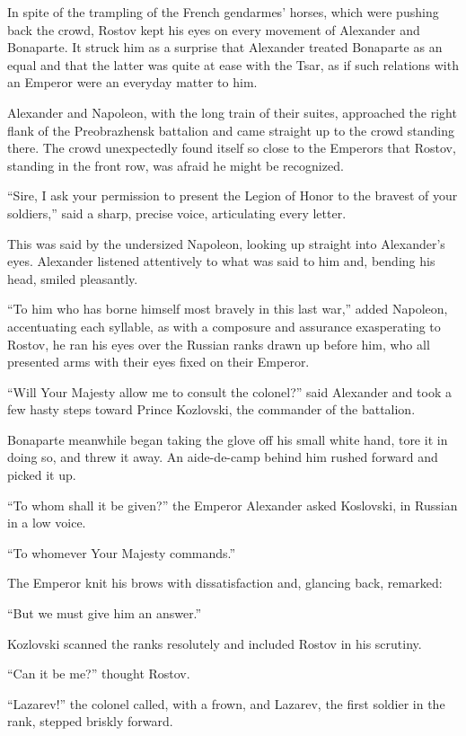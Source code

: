 In spite of the trampling of the French gendarmes' horses, which
were pushing back the crowd, Rostov kept his eyes on every
movement of Alexander and Bonaparte. It struck him as a surprise
that Alexander treated Bonaparte as an equal and that the latter
was quite at ease with the Tsar, as if such relations with an
Emperor were an everyday matter to him.

Alexander and Napoleon, with the long train of their suites,
approached the right flank of the Preobrazhensk battalion and
came straight up to the crowd standing there. The crowd
unexpectedly found itself so close to the Emperors that Rostov,
standing in the front row, was afraid he might be recognized.

``Sire, I ask your permission to present the Legion of Honor to
the bravest of your soldiers,'' said a sharp, precise voice,
articulating every letter.

This was said by the undersized Napoleon, looking up straight
into Alexander's eyes. Alexander listened attentively to what was
said to him and, bending his head, smiled pleasantly.

``To him who has borne himself most bravely in this last war,''
added Napoleon, accentuating each syllable, as with a composure
and assurance exasperating to Rostov, he ran his eyes over the
Russian ranks drawn up before him, who all presented arms with
their eyes fixed on their Emperor.

``Will Your Majesty allow me to consult the colonel?'' said
Alexander and took a few hasty steps toward Prince Kozlovski, the
commander of the battalion.

Bonaparte meanwhile began taking the glove off his small white
hand, tore it in doing so, and threw it away. An aide-de-camp
behind him rushed forward and picked it up.

``To whom shall it be given?'' the Emperor Alexander asked
Koslovski, in Russian in a low voice.

``To whomever Your Majesty commands.''

The Emperor knit his brows with dissatisfaction and, glancing
back, remarked:

``But we must give him an answer.''

Kozlovski scanned the ranks resolutely and included Rostov in his
scrutiny.

``Can it be me?'' thought Rostov.

``Lazarev!'' the colonel called, with a frown, and Lazarev, the
first soldier in the rank, stepped briskly forward.

